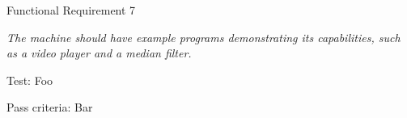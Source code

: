 {\sc Functional Requirement 7}
\begin{addmargin}[2cm]{0cm}
  {\em The machine should have example programs demonstrating its capabilities,
    such as a video player and a median filter.}
  
  {\sc Test:} Foo

  {\sc Pass criteria:} Bar
\end{addmargin}

